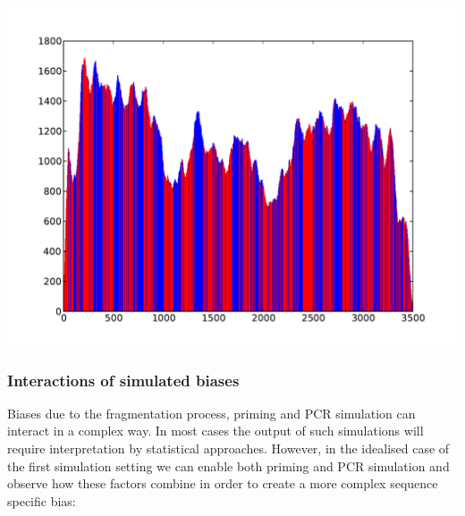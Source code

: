 \begin{center}
\includegraphics[scale=0.6,page=1]{../src/test/cov/cov_pcr.pdf}
\end{center}

\subsubsection{Interactions of simulated biases}

Biases due to the fragmentation process, priming and PCR simulation can interact in a complex way. In most cases the output of such simulations will require interpretation by statistical approaches. However, in the idealised case of the first simulation setting we can enable both priming and PCR simulation and observe how these factors combine in order to create a more complex sequence specific bias:

